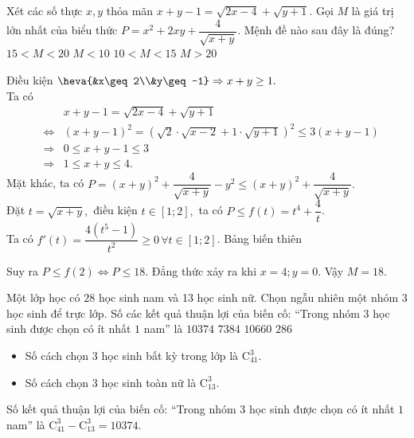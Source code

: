\begin{ex}%
	Xét các số thực $x, y$ thỏa mãn $x+y-1=\sqrt{2x-4}+\sqrt{y+1}$. Gọi $M$ là giá trị lớn nhất của biểu thức $P=x^2+2xy+\dfrac{4}{\sqrt{x+y}}$. Mệnh đề nào sau đây là đúng?
		\choice
	{\True $15<M<20$}
	{$M<10$}
	{$10<M<15$}
	{$M>20$}
	\loigiai
	{ Điều kiện $\heva{&x\geq 2\\&y\geq -1} \Rightarrow x+y \geq 1.$\\
	Ta có
	\begin{eqnarray*}
		& & x+y-1=\sqrt{2x-4}+\sqrt{y+1}\\
		&\Leftrightarrow & (x+y-1)^2 =\left( \sqrt{2}\cdot \sqrt{x-2} +1 \cdot \sqrt{y+1}\right)^2 \leq 3(x+y-1)  \\
		&\Rightarrow &  0\leq x+y-1 \leq 3\\
		& \Rightarrow &1 \leq x+y \leq 4.
	\end{eqnarray*}
Mặt khác, ta có $P= (x+y)^2+\dfrac{4}{\sqrt{x+y}} -y^2 \leq (x+y)^2+\dfrac{4}{\sqrt{x+y}}.$\\
Đặt $t=\sqrt{x+y},$ điều kiện $t \in [1;2],$ ta có $P \leq f(t)= t^4+\dfrac{4}{t}$.\\
Ta có $f'(t)= \dfrac{4(t^5-1)}{t^2} \geq 0 \, \forall t \in [1;2]$. Bảng biến thiên
\begin{center}
\end{center}
Suy ra $P \leq f(2) \Leftrightarrow P\leq 18.$ Đẳng thức xảy ra khi $x=4; y=0$.
Vậy $M=18.$
	}
\end{ex}

\begin{ex}%
	Một lớp học có $28$ học sinh nam và 13 học sinh nữ. Chọn ngẫu nhiên một nhóm $3$ học sinh để trực lớp. Số các kết quả thuận lợi của biến cố: ``Trong nhóm 3 học sinh được chọn có ít nhất $1$ nam'' là
		\choice
	{\True $10374$}
	{$7384$}
	{$10660$}
	{$286$}
	\loigiai
	{\begin{itemize}
			\item Số cách chọn $3$ học sinh bất kỳ trong lớp là $\mathrm{C}_{41}^3.$
			\item Số cách chọn $3$ học sinh toàn nữ là $\mathrm{C}_{13}^3.$
		\end{itemize}
		Số kết quả thuận lợi của biến cố: ``Trong nhóm 3 học sinh được chọn có ít nhất $1$ nam'' là $\mathrm{C}_{41}^3-\mathrm{C}_{13}^3 = 10374.$
	}
\end{ex}

